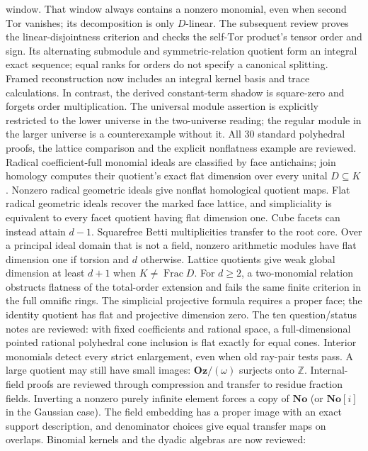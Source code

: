 \documentclass[11pt]{article}
\newcommand{\No}{\mathbf{No}}
\newcommand{\SC}{\mathbf{No}[i]}
\newcommand{\Oz}{\mathbf{Oz}}
\newcommand{\Z}{\mathbb{Z}}
\begin{document}
{window. That window always contains a nonzero monomial, even when second
$\mathrm{Tor}$ vanishes; its decomposition is only $D$-linear.
The subsequent review proves the linear-disjointness criterion and checks
the self-$\mathrm{Tor}$ product's tensor order and sign. Its alternating
submodule and symmetric-relation quotient form an integral exact sequence;
equal ranks for orders do not specify a canonical splitting.
Framed reconstruction now includes an integral kernel basis and trace
calculations. In contrast, the derived constant-term shadow is square-zero
and forgets order multiplication. The universal module assertion is
explicitly restricted to the lower universe in the two-universe reading;
the regular module in the larger universe is a counterexample without it.
All 30 standard polyhedral proofs, the lattice comparison and the explicit
nonflatness example are reviewed. Radical coefficient-full monomial ideals
are classified by face antichains; join homology computes their quotient's
exact flat dimension over every unital $D\subseteq K$. Nonzero radical geometric ideals
give nonflat homological quotient maps. Flat radical geometric ideals recover
the marked face lattice, and simpliciality is equivalent to every facet
quotient having flat dimension one. Cube facets can instead attain $d-1$.
Squarefree Betti multiplicities transfer to the root core. Over a principal
ideal domain that is not a field, nonzero arithmetic modules have flat
dimension one if torsion and $d$ otherwise. Lattice quotients give weak
global dimension at least $d+1$ when $K\ne\operatorname{Frac}D$.
For $d\ge2$, a two-monomial relation obstructs flatness of the total-order
extension and fails the same finite criterion in the full omnific rings.
The simplicial projective formula requires a proper face; the identity
quotient has flat and projective dimension zero. The ten question/status
notes are reviewed: with fixed coefficients and rational space, a
full-dimensional pointed rational polyhedral cone inclusion is flat
exactly for equal cones. Interior monomials detect every strict enlargement,
even when old ray-pair tests pass.
A large quotient may still have
small images: $\Oz/(\omega)$ surjects onto $\Z$. Internal-field proofs are
reviewed through compression and transfer to residue fraction fields.
Inverting a nonzero purely infinite element forces a copy of $\No$
(or $\SC$ in the Gaussian case). The field embedding has a proper image
with an exact support description, and denominator choices give equal transfer maps
on overlaps. Binomial kernels and the dyadic algebras are now reviewed:
}
\end{document}
